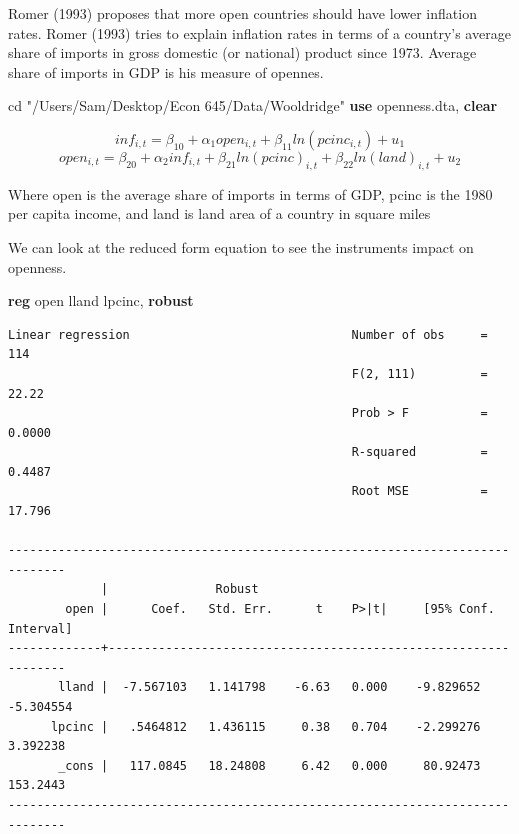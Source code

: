 \documentclass[
]{book}
\newenvironment{Shaded}{\begin{snugshade}}{\end{snugshade}}
\newcommand{\KeywordTok}[1]{\textcolor[rgb]{0.13,0.29,0.53}{\textbf{#1}}}
\newcommand{\NormalTok}[1]{#1}
\newcommand{\StringTok}[1]{\textcolor[rgb]{0.31,0.60,0.02}{#1}}
\begin{document}
Romer (1993) proposes that more open countries should have lower inflation rates. Romer (1993) tries to explain inflation rates in terms of a country's average share of imports in gross domestic (or national) product since 1973. Average share of imports in GDP is his measure of opennes.

\begin{Shaded}
\begin{Highlighting}[]
\NormalTok{cd }\StringTok{"/Users/Sam/Desktop/Econ 645/Data/Wooldridge"}
\KeywordTok{use}\NormalTok{ openness.dta, }\KeywordTok{clear}
\end{Highlighting}
\end{Shaded}

\[ inf_{i,t} = \beta_{10} + \alpha_1 open_{i,t} + \beta_{11} ln(pcinc_{i,t}) + u_1 \]
\[ open_{i,t} = \beta_{20} + \alpha_2 inf_{i,t} + \beta_{21} ln(pcinc)_{i,t} + \beta_{22} ln(land)_{i,t} + u_2 \]

Where open is the average share of imports in terms of GDP, pcinc is the 1980 per capita income, and land is land area of a country in square miles

We can look at the reduced form equation to see the instruments impact on openness.

\begin{Shaded}
\begin{Highlighting}[]
\KeywordTok{reg}\NormalTok{ open lland lpcinc, }\KeywordTok{robust}
\end{Highlighting}
\end{Shaded}

\begin{verbatim}
Linear regression                               Number of obs     =        114
                                                F(2, 111)         =      22.22
                                                Prob > F          =     0.0000
                                                R-squared         =     0.4487
                                                Root MSE          =     17.796

------------------------------------------------------------------------------
             |               Robust
        open |      Coef.   Std. Err.      t    P>|t|     [95% Conf. Interval]
-------------+----------------------------------------------------------------
       lland |  -7.567103   1.141798    -6.63   0.000    -9.829652   -5.304554
      lpcinc |   .5464812   1.436115     0.38   0.704    -2.299276    3.392238
       _cons |   117.0845   18.24808     6.42   0.000     80.92473    153.2443
------------------------------------------------------------------------------
\end{verbatim}
\end{document}
